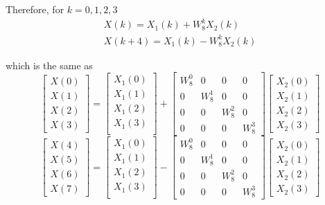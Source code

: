 \documentclass[journal,12pt,twocolumn]{IEEEtran}
\numberwithin{equation}{section}
\renewcommand\thesection{\arabic{section}}
\begin{document}
\begin{enumerate}[label=\thesection.\arabic*]
    Therefore, for $k=0,1,2,3$
    \begin{align}
    		X(k) = X_1(k) + W_8^k X_2(k)  \\
    		X(k+4) = X_1(k) - W_8^k X_2(k) 
    \end{align}
    
    which is the same as
    \begin{equation}
\begin{bmatrix}
X(0) \\ 
X(1) \\ 
X(2) \\ 
X(3)
\end{bmatrix}
=
\begin{bmatrix}
X_{1}(0) \\ 
X_{1}(1)\\ 
X_{1}(2)\\
X_{1}(3)\\
\end{bmatrix}
+
\begin{bmatrix}
W^{0}_{8} & 0 & 0 & 0\\
0 & W^{1}_{8} & 0 & 0\\
0 & 0 & W^{2}_{8} & 0\\
0 & 0 & 0 & W^{3}_{8}
\end{bmatrix}
\begin{bmatrix}
X_{2}(0) \\ 
X_{2}(1) \\ 
X_{2}(2) \\
X_{2}(3)
\end{bmatrix}
\end{equation}
\begin{equation}
\begin{bmatrix}
X(4) \\ 
X(5) \\ 
X(6) \\ 
X(7)
\end{bmatrix}
=
\begin{bmatrix}
X_{1}(0) \\ 
X_{1}(1)\\ 
X_{1}(2)\\
X_{1}(3)\\
\end{bmatrix}
-
\begin{bmatrix}
W^{0}_{8} & 0 & 0 & 0\\
0 & W^{1}_{8} & 0 & 0\\
0 & 0 & W^{2}_{8} & 0\\
0 & 0 & 0 & W^{3}_{8}
\end{bmatrix}
\begin{bmatrix}
X_{2}(0) \\ 
X_{2}(1) \\ 
X_{2}(2) \\
X_{2}(3)
\end{bmatrix}
\end{equation}


\end{enumerate}
\end{document}
